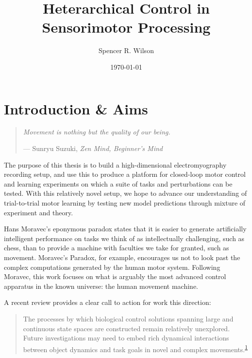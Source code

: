 \documentclass[
  a4paper,
]{article}
\title{Heterarchical Control in Sensorimotor Processing}
\author{Spencer R. Wilson}
\date{\today}
\begin{document}
\maketitle

\hypertarget{sec:intro}{%
\section{Introduction \& Aims}\label{sec:intro}}

\begin{quote}
\emph{Movement is nothing but the quality of our being.}

--- Sunryu Suzuki, \emph{Zen Mind, Beginner's Mind}
\end{quote}

The purpose of this thesis is to build a high-dimensional
electromyography recording setup, and use this to produce a platform for
closed-loop motor control and learning experiments on which a suite of
tasks and perturbations can be tested. With this relatively novel setup,
we hope to advance our understanding of trial-to-trial motor learning by
testing new model predictions through mixture of experiment and theory.

Hans Moravec's eponymous paradox states that it is easier to generate
artificially intelligent performance on tasks we think of as
intellectually challenging, such as chess, than to provide a machine
with faculties we take for granted, such as movement. Moravec's Paradox,
for example, encourages us not to look past the complex computations
generated by the human motor system. Following Moravec, this work
focuses on what is arguably the most advanced control apparatus in the
known universe: the human movement machine.

A recent review provides a clear call to action for work this direction:

\begin{quote}
The processes by which biological control solutions spanning large and
continuous state spaces are constructed remain relatively unexplored.
Future investigations may need to embed rich dynamical interactions
between object dynamics and task goals in novel and complex
movements.\textsuperscript{\protect\hyperlink{ref-McNamee2019}{1}}
\end{quote}
\end{document}
